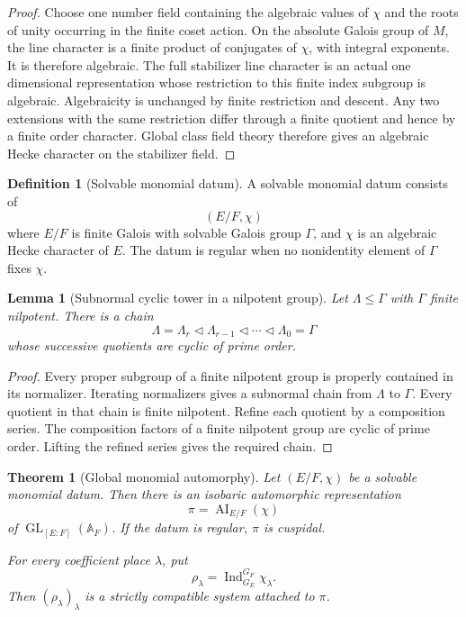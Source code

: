 \documentclass{aomart}
\newtheorem{theorem}{Theorem}[section]
\newtheorem{lemma}[lemma]{Lemma}
\theoremstyle{definition}
\newtheorem{definition}[definition]{Definition}
\theoremstyle{remark}
\newcommand{\GL}{\operatorname{GL}}
\newcommand{\Ind}{\operatorname{Ind}}
\newcommand{\AI}{\operatorname{AI}}
\newcommand{\Adele}{\mathbb A}
\begin{document}
\begin{proof}
Choose one number field containing the algebraic values of \(\chi\) and the roots of unity occurring in the finite coset action. On the absolute Galois group of \(M\), the line character is a finite product of conjugates of \(\chi\), with integral exponents. It is therefore algebraic. The full stabilizer line character is an actual one dimensional representation whose restriction to this finite index subgroup is algebraic. Algebraicity is unchanged by finite restriction and descent. Any two extensions with the same restriction differ through a finite quotient and hence by a finite order character. Global class field theory therefore gives an algebraic Hecke character on the stabilizer field.
\end{proof}

\begin{definition}[Solvable monomial datum]\label{def:solvable_global_datum}
A solvable monomial datum consists of
\[
(E/F,\chi)
\]
where \(E/F\) is finite Galois with solvable Galois group \(\Gamma\), and \(\chi\) is an algebraic Hecke character of \(E\). The datum is regular when no nonidentity element of \(\Gamma\) fixes \(\chi\).
\end{definition}

\begin{lemma}[Subnormal cyclic tower in a nilpotent group]\label{lem:nilpotent_subnormal}
Let \(\Lambda\leq\Gamma\) with \(\Gamma\) finite nilpotent. There is a chain
\[
\Lambda=\Lambda_r
\triangleleft
\Lambda_{r-1}
\triangleleft\cdots\triangleleft
\Lambda_0=\Gamma
\]
whose successive quotients are cyclic of prime order.
\end{lemma}

\begin{proof}
Every proper subgroup of a finite nilpotent group is properly contained in its normalizer. Iterating normalizers gives a subnormal chain from \(\Lambda\) to \(\Gamma\). Every quotient in that chain is finite nilpotent. Refine each quotient by a composition series. The composition factors of a finite nilpotent group are cyclic of prime order. Lifting the refined series gives the required chain.
\end{proof}

\begin{theorem}[Global monomial automorphy]\label{thm:global_monomial_automorphy}
Let \((E/F,\chi)\) be a solvable monomial datum. Then there is an isobaric automorphic representation
\[
\boxed{
\pi=\AI_{E/F}(\chi)
}
\]
of \(\GL_{[E:F]}(\Adele_F)\). If the datum is regular, \(\pi\) is cuspidal.

For every coefficient place \(\lambda\), put
\[
\rho_\lambda
=
\Ind_{G_E}^{G_F}\chi_\lambda.
\]
Then \((\rho_\lambda)_\lambda\) is a strictly compatible system attached to \(\pi\).
\end{theorem}
\end{document}
